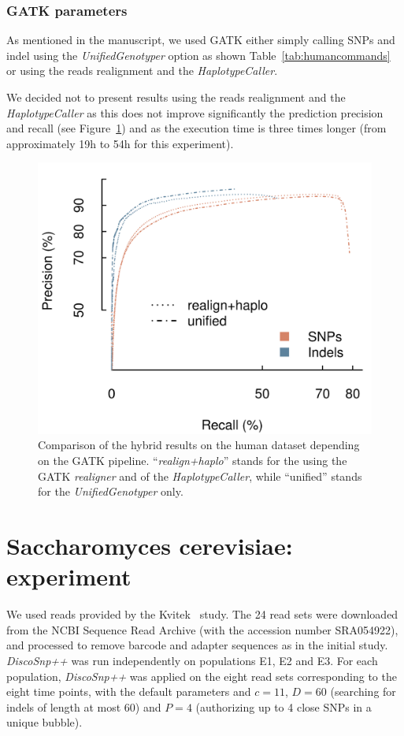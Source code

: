 \documentclass{bmcart}
\newcommand{\discopp}{{\it DiscoSnp++}\xspace}
\begin{document}
\subsubsection*{GATK parameters} %
As mentioned in the manuscript, we used GATK either simply calling SNPs and indel using the \emph{UnifiedGenotyper} option as shown Table~\ref{tab:humancommands} or using the reads realignment and the \emph{HaplotypeCaller}.

We decided not to present results using the reads realignment and the \emph{HaplotypeCaller} as this does not improve significantly the prediction precision and recall (see Figure~\ref{fig:figures_roc_gatk}) and as the execution time is three times longer (from approximately 19h to 54h for this experiment). 

\begin{figure}[h]
	\centering
		\includegraphics[width=.9\textwidth]{figures/roc_gatk.png}
	\caption{Comparison of the hybrid results on the human dataset depending on the GATK pipeline. ``\emph{realign+haplo}'' stands for the using the GATK \emph{realigner} and of the \emph{HaplotypeCaller}, while ``{unified}'' stands for the \emph{UnifiedGenotyper} only.}
	\label{fig:figures_roc_gatk}
\end{figure}



\section*{Saccharomyces cerevisiae: experiment}
We used reads provided by the Kvitek~\cite{Kvitek2013} study. The 24 read sets were downloaded from the NCBI Sequence Read Archive (with the accession number SRA054922), and processed to remove barcode and adapter sequences as in the initial study. \discopp was run independently on populations E1, E2
and E3. For each population, \discopp was applied on the eight read sets corresponding to the eight time points, with
the default parameters and $c=11$, $D=60$ (searching for indels of length at most 60) and $P=4$ (authorizing up to 4 close SNPs in a unique bubble).
\end{document}
